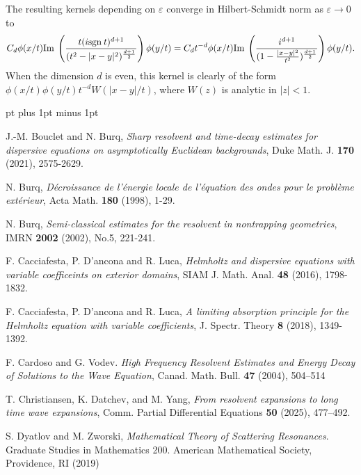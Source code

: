 \documentclass[11pt]{amsart}
\numberwithin{equation}{section}
\def\Im{{\rm Im}\:}
\def\sgn{{\rm sgn}\:}
\begin{document}
The resulting kernels depending on $\varepsilon$ converge in Hilbert-Schmidt norm as $\varepsilon \to 0$ to
\begin{equation*}
 C_d \phi(x/t) \Im \left( \frac{t (i\sgn t)^{d+1}}{(t^2 - |x - y|^2)^{\frac{d+1}{2}}} \right) \phi(y/t) = C_d t^{-d}   \phi(x/t) \Im \left( \frac{ i^{d+1}}{(1 - \frac{|x - y|^2}{t^2})^{\frac{d+1}{2}}} \right) \phi(y/t) .
\end{equation*}
When the dimension $d$ is even, this kernel is clearly of the form $\phi(x/t) \phi(y/t) t^{-d} W(|x - y|/t)$, where $W(z)$ is analytic in $|z| < 1$. 


\begin{thebibliography}
\frenchspacing {} pt plus 1pt minus 1pt

 {\sc J.-M. Bouclet and N. Burq}, {\em Sharp resolvent and time-decay estimates for dispersive equations on
asymptotically Euclidean backgrounds}, Duke Math. J. {\bf 170} (2021), 2575-2629.

 {\sc N. Burq}, {\em D\'ecroissance de l'\'energie locale de l'\'equation des ondes pour le probl\`eme ext\'erieur},
Acta Math. {\bf 180} (1998), 1-29.

 {\sc N. Burq}, {\em Semi-classical estimates for the resolvent in nontrapping geometries}, IMRN {\bf 2002} (2002), No.5,
221-241.

 {\sc F. Cacciafesta, P. D'ancona and R. Luca}, {\em Helmholtz and dispersive equations with variable coefficeints on exterior
domains}, SIAM J. Math. Anal. {\bf 48} (2016), 1798-1832.

 {\sc F. Cacciafesta, P. D'ancona and R. Luca}, {\em A limiting absorption principle for the Helmholtz equation with variable coefficients}, J. Spectr. Theory {\bf 8} (2018), 1349-1392.

 {\sc F. Cardoso and G. Vodev}. {\em High Frequency Resolvent Estimates and Energy Decay of Solutions to the Wave Equation}, Canad. Math. Bull. {\bf 47} (2004), 504--514

 {\sc T. Christiansen, K. Datchev, and M. Yang}, {\em From resolvent expansions to long time wave expansions}, Comm. Partial Differential Equations {\bf 50}  (2025), 477--492.


 {\sc S. Dyatlov and M. Zworski}, {\em Mathematical Theory of Scattering Resonances}. Graduate Studies in Mathematics 200. American Mathematical Society, Providence, RI (2019)


\end{thebibliography}
\end{document}
